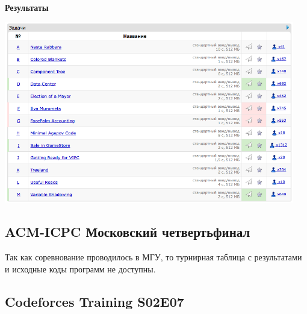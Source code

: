\documentclass[a4paper,12pt]{article}
\begin{document}
\newpage
\textbf{{\large Результаты}} \\
\begin{center}
\includegraphics[width=0.95\textwidth]{CT_ACM_WEST/CT_ACM_WEST_result.png}\\ [1cm]
\end{center}



%
%
\newpage
\subsection{ACM-ICPC Московский четвертьфинал}

Так как соревнование проводилось в МГУ, то турнирная таблица с результатами и исходные коды программ не доступны. \\



%
%
\newpage
\subsection{Codeforces Training S02E07}
\end{document}
